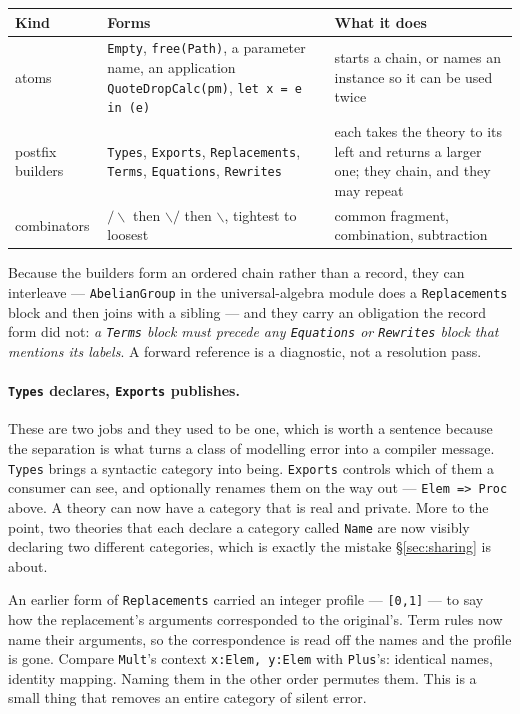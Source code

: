 \begin{center}
\small
\begin{tabular}{@{}L{0.20\textwidth}L{0.34\textwidth}L{0.36\textwidth}@{}}
\toprule
\textbf{Kind} & \textbf{Forms} & \textbf{What it does} \\
\midrule
atoms &
\texttt{Empty}, \texttt{free(Path)}, a parameter name, an application
\texttt{QuoteDropCalc(pm)}, \texttt{let x = e in (e)} &
starts a chain, or names an instance so it can be used twice \\[3pt]
postfix builders &
\texttt{Types}, \texttt{Exports}, \texttt{Replacements}, \texttt{Terms},
\texttt{Equations}, \texttt{Rewrites} &
each takes the theory to its left and returns a larger one; they chain, and
they may repeat \\[3pt]
combinators &
$/\!\backslash$ then $\backslash\!/$ then $\backslash$, tightest to loosest &
common fragment, combination, subtraction \\
\bottomrule
\end{tabular}
\end{center}

Because the builders form an ordered chain rather than a record, they can
interleave --- \texttt{AbelianGroup} in the universal-algebra module does a
\texttt{Replacements} block and then joins with a sibling --- and they carry an
obligation the record form did not: \emph{a \texttt{Terms} block must precede
any \texttt{Equations} or \texttt{Rewrites} block that mentions its labels}.
A forward reference is a diagnostic, not a resolution pass.

\paragraph{\texttt{Types} declares, \texttt{Exports} publishes.} These are two
jobs and they used to be one, which is worth a sentence because the separation
is what turns a class of modelling error into a compiler message.
\texttt{Types} brings a syntactic category into being. \texttt{Exports} controls
which of them a consumer can see, and optionally renames them on the way out
--- \texttt{Elem => Proc} above. A theory can now have a category that is real
and private. More to the point, two theories that each declare a category
called \texttt{Name} are now visibly declaring two different categories, which
is exactly the mistake \S\ref{sec:sharing} is about.

\begin{aside}
An earlier form of \texttt{Replacements} carried an integer profile ---
\texttt{[0,1]} --- to say how the replacement's arguments corresponded to the
original's. Term rules now name their arguments, so the correspondence is read
off the names and the profile is gone. Compare \texttt{Mult}'s context
\texttt{x:Elem, y:Elem} with \texttt{Plus}'s: identical names, identity
mapping. Naming them in the other order permutes them. This is a small thing
that removes an entire category of silent error.
\end{aside}

